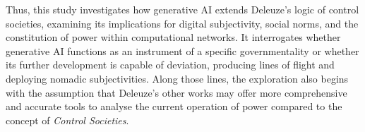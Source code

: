 Thus, this study investigates how generative AI extends Deleuze’s logic of control societies, examining its implications for digital subjectivity, social norms, and the constitution of power within computational networks. It interrogates whether generative AI functions as an instrument of a specific governmentality or whether its further development is capable of deviation, producing lines of flight and deploying nomadic subjectivities. Along those lines, the exploration also begins with the assumption that Deleuze’s other works  may offer more comprehensive and accurate tools to analyse the current operation of power compared to the concept of \textit{Control Societies}.



